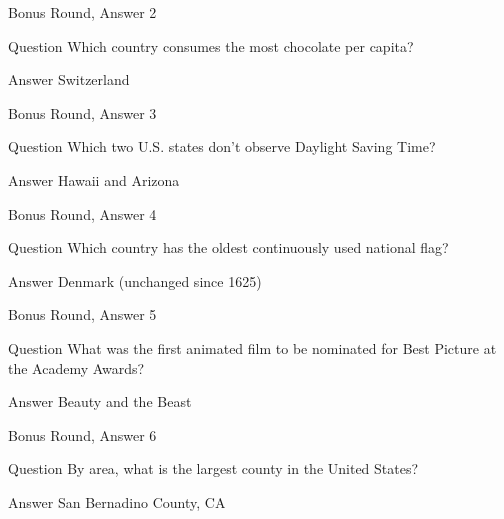 \documentclass[11pt]{beamer}
\begin{document}
\begin{frame}[t]{Bonus Round, Answer 2}
  \vspace{2em}
  \begin{block}{Question}
    Which country consumes the most chocolate per capita\@?
  \end{block}
  \pause{}
  \begin{block}{Answer}
    Switzerland
  \end{block}
\end{frame}


\begin{frame}[t]{Bonus Round, Answer 3}
  \vspace{2em}
  \begin{block}{Question}
    Which two U.S. states don't observe Daylight Saving Time\@?
  \end{block}
  \pause{}
  \begin{block}{Answer}
    Hawaii and Arizona
  \end{block}
\end{frame}


\begin{frame}[t]{Bonus Round, Answer 4}
  \vspace{2em}
  \begin{block}{Question}
    Which country has the oldest continuously used national flag\@?
  \end{block}
  \pause{}
  \begin{block}{Answer}
    Denmark (unchanged since 1625)
  \end{block}
\end{frame}


\begin{frame}[t]{Bonus Round, Answer 5}
  \vspace{2em}
  \begin{block}{Question}
    What was the first animated film to be nominated for Best Picture at the Academy Awards\@?
  \end{block}
  \pause{}
  \begin{block}{Answer}
    Beauty and the Beast
  \end{block}
\end{frame}


\begin{frame}[t]{Bonus Round, Answer 6}
  \vspace{2em}
  \begin{block}{Question}
    By area, what is the largest county in the United States\@?
  \end{block}
  \pause{}
  \begin{block}{Answer}
    San Bernadino County, CA
  \end{block}
\end{frame}
\end{document}
